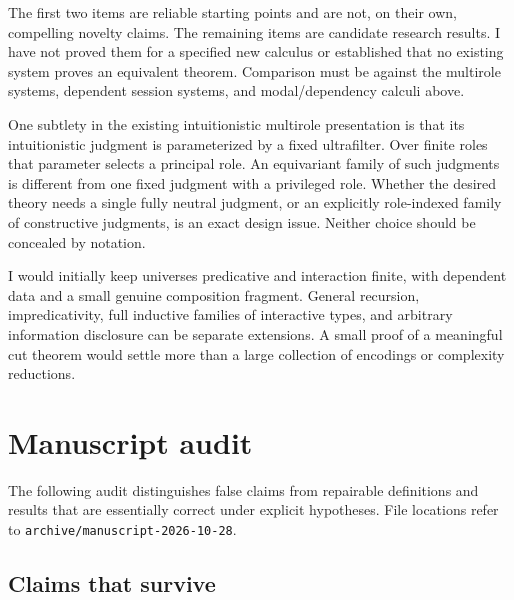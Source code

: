\documentclass[11pt]{article}
\begin{document}
The first two items are reliable starting points and are not, on their own,
compelling novelty claims. The remaining items are candidate research results.
I have not proved them for a specified new calculus or established that no
existing system proves an equivalent theorem. Comparison must be against the
multirole systems, dependent session systems, and modal/dependency calculi above.

One subtlety in the existing intuitionistic multirole presentation is that its
intuitionistic judgment is parameterized by a fixed ultrafilter. Over finite
roles that parameter selects a principal role. An equivariant family of such
judgments is different from one fixed judgment with a privileged role. Whether
the desired theory needs a single fully neutral judgment, or an explicitly
role-indexed family of constructive judgments, is an exact design issue. Neither
choice should be concealed by notation.

I would initially keep universes predicative and interaction finite, with
dependent data and a small genuine composition fragment. General recursion,
impredicativity, full inductive families of interactive types, and arbitrary
information disclosure can be separate extensions. A small proof of a meaningful
cut theorem would settle more than a large collection of encodings or
complexity reductions.

\appendix
\section{Manuscript audit}

The following audit distinguishes false claims from repairable definitions and
results that are essentially correct under explicit hypotheses. File locations
refer to \texttt{archive/manuscript-2026-10-28}.

\subsection{Claims that survive}
\end{document}
